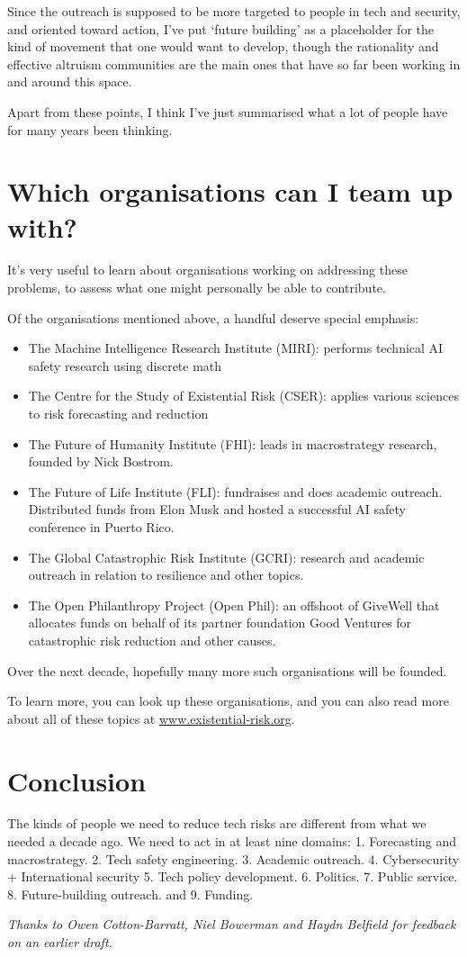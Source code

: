 ﻿\documentclass[12pt]{article}
\begin{document}
Since the outreach is supposed to be more targeted to people in tech and security, and oriented toward action, I've put `future building' as a placeholder for the kind of movement that one would want to develop, though the rationality and effective altruism communities are the main ones that have so far been working in and around this space.

Apart from these points, I think I've just summarised what a lot of people have for many years been thinking.
\section{Which organisations can I team up with?}
It's very useful to learn about organisations working on addressing these problems, to assess what one might personally be able to contribute.

Of the organisations mentioned above, a handful deserve special emphasis:
\begin{itemize}
    \item The Machine Intelligence Research Institute (MIRI): performs technical AI safety research using discrete math
    \item The Centre for the Study of Existential Risk (CSER): applies various sciences to risk forecasting and reduction
    \item The Future of Humanity Institute (FHI): leads in macrostrategy research, founded by Nick Bostrom.
    \item The Future of Life Institute (FLI): fundraises and does academic outreach. Distributed funds from Elon Musk and hosted a successful AI safety conference in Puerto Rico.
    \item The Global Catastrophic Risk Institute (GCRI): research and academic outreach in relation to resilience and other topics.
    \item The Open Philanthropy Project (Open Phil): an offshoot of GiveWell that allocates funds on behalf of its partner foundation Good Ventures for catastrophic risk reduction and other causes.
\end{itemize}

Over the next decade, hopefully many more such organisations will be founded.

To learn more, you can look up these organisations, 
and you can also read more about all of these topics 
at \href{www.existential-risk.org}{www.existential-risk.org}.

\section{Conclusion}
The kinds of people we need to reduce tech risks are different from what we needed a decade ago. We need to act in at least nine domains: 1. Forecasting and macrostrategy. 2. Tech safety engineering. 3. Academic outreach. 4. Cybersecurity + International security 5. Tech policy development. 6. Politics. 7. Public service. 8. Future-building outreach. and 9. Funding.

\vspace{3em}

{\itshape Thanks to Owen Cotton-Barratt, Niel Bowerman and Haydn Belfield for feedback on an earlier draft.}
\end{document}
